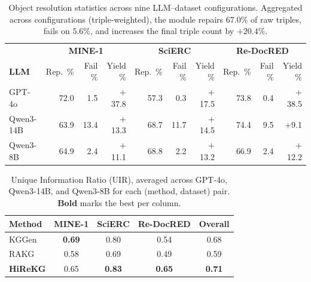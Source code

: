 \documentclass[11pt]{article}
\begin{document}
\begin{table}[t!]
\centering
\small
\setlength{\tabcolsep}{4pt}
\renewcommand{\arraystretch}{1.15}
\begin{tabular}{l|rrr|rrr|rrr}
\toprule
& \multicolumn{3}{c|}{\textbf{MINE-1}} & \multicolumn{3}{c|}{\textbf{SciERC}} & \multicolumn{3}{c}{\textbf{Re-DocRED}} \\
\textbf{LLM} & Rep.\ \% & Fail \% & Yield \% & Rep.\ \% & Fail \% & Yield \% & Rep.\ \% & Fail \% & Yield \% \\
\midrule
GPT-4o    & 72.0 &  1.5 & $+$37.8 & 57.3 &  0.3 & $+$17.5 & 73.8 &  0.4 & $+$38.5 \\
Qwen3-14B & 63.9 & 13.4 & $+$13.3 & 68.7 & 11.7 & $+$14.5 & 74.4 &  9.5 & $+$9.1  \\
Qwen3-8B  & 64.9 &  2.4 & $+$11.1 & 68.8 &  2.2 & $+$13.2 & 66.9 &  2.4 & $+$12.2 \\
\bottomrule
\end{tabular}
\caption{Object resolution statistics across nine LLM--dataset configurations. Aggregated across configurations (triple-weighted), the module repairs $67.0\%$ of raw triples, fails on $5.6\%$, and increases the final triple count by $+20.4\%$.}
\label{tab:obj-res-stats}
\end{table}



\begin{table}[h]
\centering
\small
\setlength{\tabcolsep}{6pt}
\renewcommand{\arraystretch}{1.15}
\begin{tabular}{l|ccc|c}
\toprule
\textbf{Method} & \textbf{MINE-1} & \textbf{SciERC} & \textbf{Re-DocRED} & \textbf{Overall} \\
\midrule
KGGen           & \textbf{0.69} & 0.80          & 0.54          & 0.68 \\
RAKG            & 0.58          & 0.69          & 0.49          & 0.59 \\
\textbf{HiReKG} & 0.65          & \textbf{0.83} & \textbf{0.65} & \textbf{0.71} \\
\bottomrule
\end{tabular}
\caption{Unique Information Ratio (UIR), averaged across GPT-4o, Qwen3-14B, and Qwen3-8B for each (method, dataset) pair. \textbf{Bold} marks the best per column.}
\label{tab:uir}
\end{table}
\end{document}
